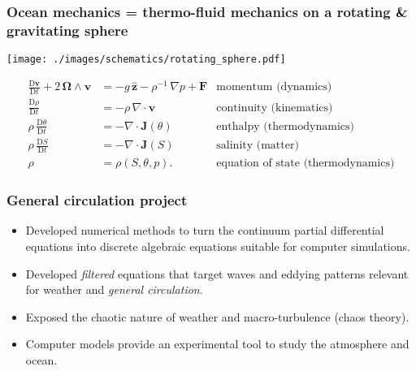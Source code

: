 \documentclass[10pt]{beamer}
\begin{document}
\begin{frame}
  \frametitle{Ocean mechanics = thermo-fluid mechanics on a rotating
    \& gravitating sphere}

\begin{center}
\vspace{-.25cm}
{\texttt{[image: ./images/schematics/rotating\_sphere.pdf]}}
\end{center}


\footnotesize 
\begin{align}
  \frac{\mathrm{D} {\bm v}  }{\mathrm{D}t} 
  + 2  \, {\bm \Omega} \wedge {\bm v} &= 
  - g \, \hat{\bm z} -\rho^{-1} \,  \nabla p + {\bm F}
 & \mbox{momentum (dynamics)}  
\label{eq:gfd-fluid-equation-of-motion-summary} 
  \\
  \frac{\mathrm{D}\rho}{\mathrm{D}t} &= -\rho \, \nabla \cdot {\bm v}
 &  \mbox{continuity (kinematics)}  
\label{eq:gfd-fluid-mass-equation-summary} 
  \\
 \rho \, \frac{\mathrm{D}\theta}{\mathrm{D}t}
 &= -\nabla \cdot {\bm J}(\theta)
 & \mbox{enthalpy (thermodynamics)}
  \label{eq:gfd-fluid-thermo-equation-summary} 
  \\
 \rho \, \frac{\mathrm{D}S}{\mathrm{D}t} 
 &= -\nabla \cdot {\bm J}(S)
 & \mbox{salinity (matter)}
\label{eq:gfd-fluid-matter-equation-summary} 
 \\
   \rho &= \rho(S,\theta,p). 
 & \mbox{equation of state (thermodynamics)}
\label{eq:eos-summary}   
\end{align}

\end{frame}


\begin{frame}
  \frametitle{General circulation project}

\begin{center}
\vspace{-.25cm}
\end{center}

\begin{exampleblock}{}
\begin{itemize}

\item Developed numerical methods to turn the continuum partial
  differential equations into discrete algebraic equations suitable
  for computer simulations.

\item Developed {\it filtered} equations that target waves and eddying
  patterns relevant for weather and {\it general circulation}.

\item Exposed the chaotic nature of weather and macro-turbulence (chaos theory). 

\item Computer models provide an experimental tool to study the
  atmosphere and ocean.

\end{itemize}
\end{exampleblock}{}

\end{frame}
\end{document}
